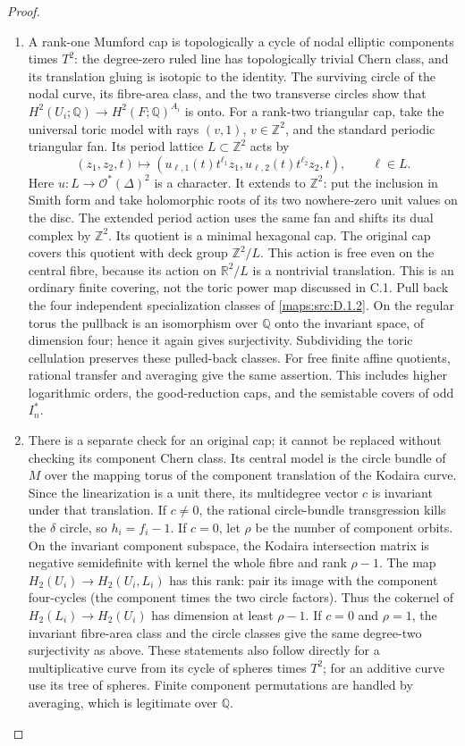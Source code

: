 \begin{proof}
\begin{enumerate}[label=\arabic*.,leftmargin=*]
\item A rank-one Mumford cap is topologically a cycle of nodal elliptic
components times $T^2$: the degree-zero ruled line has topologically
trivial Chern class, and its translation gluing is isotopic to the
identity. The surviving circle of the nodal curve, its fibre-area
class, and the two transverse circles show that
$H^2(U_i;\mathbb Q)\to H^2(F;\mathbb Q)^{A_i}$ is onto.
For a rank-two triangular cap, take the universal toric model with
rays $(v,1)$, $v\in\mathbb Z^2$, and the standard periodic triangular
fan. Its period lattice $L\subset\mathbb Z^2$ acts by
\[
 (z_1,z_2,t)\longmapsto
 (u_{\ell,1}(t)t^{\ell_1}z_1,
  u_{\ell,2}(t)t^{\ell_2}z_2,t),\qquad \ell\in L.
\]
Here $u:L\to\mathcal O^*(\Delta)^2$ is a character. It extends to
$\mathbb Z^2$: put the inclusion in Smith form and take holomorphic
roots of its two nowhere-zero unit values on the disc. The extended
period action uses the same fan and shifts its dual complex by
$\mathbb Z^2$. Its quotient is a minimal hexagonal cap. The original
cap covers this quotient with deck group $\mathbb Z^2/L$. This
action is free even on the central fibre, because its action on
$\mathbb R^2/L$ is a nontrivial translation. This is an ordinary
finite covering, not the toric power map discussed in C.1.
Pull back the four independent specialization classes of \ref{maps:src:D.1.2}. On the regular torus
the pullback is an isomorphism over $\mathbb Q$ onto the invariant
space, of dimension four; hence it again gives surjectivity.
Subdividing the toric cellulation preserves these pulled-back classes.
For free finite affine quotients, rational transfer and averaging
give the same assertion. This includes higher logarithmic orders,
the good-reduction caps, and the semistable covers of odd $I_n^*$.

\item There is a separate check for an original cap; it cannot be replaced
without checking its component Chern class. Its central model is
the circle bundle of $M$ over the mapping torus of the component
translation of the Kodaira curve. Since the linearization is a unit
there, its multidegree vector $c$ is invariant under that translation.
If $c\ne0$, the rational circle-bundle transgression kills the
$\delta$ circle, so $h_i=f_i-1$. If $c=0$, let $\rho$ be the number
of component orbits. On the invariant component subspace, the
Kodaira intersection matrix is negative semidefinite with kernel
the whole fibre and rank $\rho-1$. The map
$H_2(U_i)\to H_2(U_i,L_i)$ has this rank: pair its image with the
component four-cycles (the component times the two circle factors).
Thus the cokernel of $H_2(L_i)\to H_2(U_i)$ has dimension at least
$\rho-1$. If $c=0$ and $\rho=1$, the invariant fibre-area class
and the circle classes give the same degree-two surjectivity as
above. These statements also follow directly for a multiplicative
curve from its cycle of spheres times $T^2$; for an additive curve
use its tree of spheres. Finite component permutations are handled
by averaging, which is legitimate over $\mathbb Q$.


\end{enumerate}
\end{proof}
